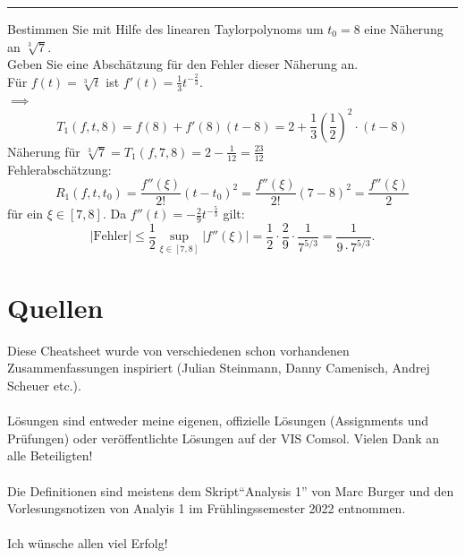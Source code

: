 \documentclass[a4paper,fontsize = 7pt]{scrartcl}
\begin{document}
\vspace{0.1 cm}
\hrule
\vspace{0.2 cm}

Bestimmen Sie mit Hilfe des linearen Taylorpolynoms um $t_0 = 8$ eine Näherung
an $\sqrt[3]{7}$.
\\Geben Sie eine Abschätzung für den Fehler dieser Näherung an.
\\Für $f(t) = \sqrt[3]{t}$ ist $f'(t) = \frac{1}{3}t^{-\frac{2}{3}}$.
\\$\implies$ 
$$T_1(f, t, 8) = f(8) + f'(8)(t - 8) = 2 + \frac{1}{3}\left(\frac{1}{2}\right)^2 \cdot (t- 8)$$ 
Näherung für $\sqrt[3]{7} = T_1(f, 7, 8) = 2 - \frac{1}{12} = \frac{23}{12}$
\\Fehlerabschätzung:
$$R_1(f, t, t_0) = \frac{f''(\xi)}{2!}(t - t_0)^2 = \frac{f''(\xi)}{2!}(7-8)^2 = \frac{f''(\xi)}{2}$$
für ein $\xi \in [7, 8]$.
Da $f''(t) =-\frac{2}{9} t^{-\frac{5}{3}}$ gilt:
$$|\text{Fehler}| \leq \frac{1}{2} \sup_{\xi \in [7, 8]} |f''(\xi)| = \frac{1}{2}\cdot \frac{2}{9} \cdot \frac{1}{7^{5/3}} = \frac{1}{9 \cdot 7^{5/3}}.$$

\section{Quellen}
Diese Cheatsheet wurde von verschiedenen schon vorhandenen Zusammenfassungen inspiriert (Julian Steinmann, Danny Camenisch, Andrej Scheuer etc.). 
\\ \\
Lösungen sind entweder meine eigenen, offizielle Lösungen (Assignments und Prüfungen) oder veröffentlichte Lösungen auf der VIS Comsol. Vielen Dank an alle Beteiligten!
\\ \\
Die Definitionen sind meistens dem Skript“Analysis 1” von Marc Burger und den Vorlesungsnotizen von Analyis 1 im Frühlingssemester 2022 entnommen.
\\ \\
Ich wünsche allen viel Erfolg!
\end{document}
